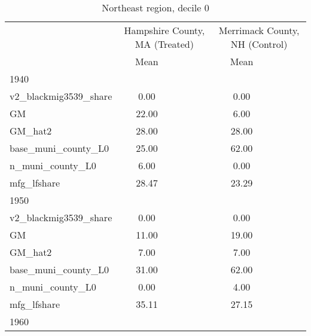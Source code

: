 \begin{table}[htbp]\centering
\def\sym#1{\ifmmode^{#1}\else\(^{#1}\)\fi}
\caption{Northeast region, decile 0 \label{tab1}}
\begin{tabular}{l*{2}{ccc}}
\toprule
                    &\multicolumn{3}{c}{Hampshire County, MA (Treated)}&\multicolumn{3}{c}{Merrimack County, NH (Control)}\\
                    &        Mean&            &            &        Mean&            &            \\
\midrule
1940                &            &            &            &            &            &            \\
v2\_blackmig3539\_share&        0.00&            &            &        0.00&            &            \\
GM                  &       22.00&            &            &        6.00&            &            \\
GM\_hat2             &       28.00&            &            &       28.00&            &            \\
base\_muni\_county\_L0 &       25.00&            &            &       62.00&            &            \\
n\_muni\_county\_L0    &        6.00&            &            &        0.00&            &            \\
mfg\_lfshare         &       28.47&            &            &       23.29&            &            \\
\midrule
1950                &            &            &            &            &            &            \\
v2\_blackmig3539\_share&        0.00&            &            &        0.00&            &            \\
GM                  &       11.00&            &            &       19.00&            &            \\
GM\_hat2             &        7.00&            &            &        7.00&            &            \\
base\_muni\_county\_L0 &       31.00&            &            &       62.00&            &            \\
n\_muni\_county\_L0    &        0.00&            &            &        4.00&            &            \\
mfg\_lfshare         &       35.11&            &            &       27.15&            &            \\
\midrule
1960                &            &            &            &            &            &            \\

\end{tabular}
\end{table}
